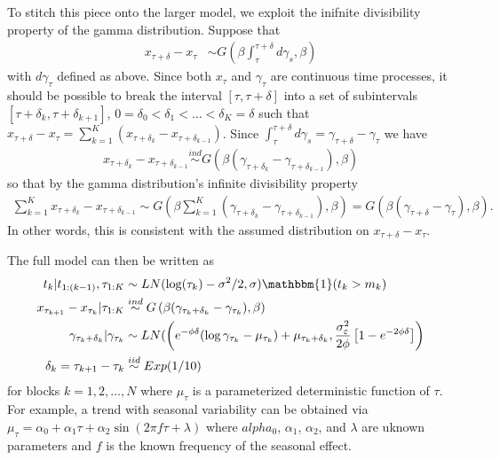 \documentclass{article}
\begin{document}
To stitch this piece onto the larger model, we exploit the inifnite divisibility property of the gamma distribution. Suppose that
\begin{align*}
x_{\tau + \delta} - x_\tau &\sim G(\beta \int_{\tau}^{\tau + \delta} d\gamma_s, \beta)
\end{align*}
with $d\gamma_\tau$ defined as above. Since both $x_{\tau}$ and $\gamma_{\tau}$ are continuous time processes, it should be possible to break the interval $[\tau, \tau + \delta]$ into a set of subintervals $[\tau + \delta_k, \tau + \delta_{k+1}]$, $0=\delta_0<\delta_1<\dots<\delta_K=\delta$ such that $x_{\tau + \delta} - x_{\tau} = \sum_{k=1}^K (x_{\tau + \delta_k} - x_{\tau + \delta_{k-1}})$. Since $\int_{\tau}^{\tau + \delta}d\gamma_s = \gamma_{\tau + \delta} - \gamma_{\tau}$ we have 
\begin{align*}
x_{\tau + \delta_k} - x_{\tau + \delta_{k-1}} \stackrel{ind}{\sim} G(\beta(\gamma_{\tau + \delta_k} - \gamma_{\tau + \delta_{k-1}}), \beta)
\end{align*}
so that by the gamma distribution's infinite divisibility property
\begin{align*}
\sum_{k=1}^Kx_{\tau + \delta_k} - x_{\tau + \delta_{k-1}} \sim G\left(\beta\sum_{k=1}^K(\gamma_{\tau + \delta_k} - \gamma_{\tau + \delta_{k-1}}), \beta\right) = G\left(\beta(\gamma_{\tau + \delta} - \gamma_\tau), \beta\right).
\end{align*}
In other words, this is consistent with the assumed distribution on $x_{\tau + \delta} - x_{\tau}$.

The full model can then be written as
\begin{align*}
t_k|t_{1:(k-1)}, \tau_{1:K} &\sim LN(\log(\tau_k) - \sigma^2/2, \sigma)\mathbbm{1}(t_k > m_k)\\
x_{\tau_{k+1}} - x_{\tau_{k}}|\tau_{1:K} & \stackrel{ind}{\sim} G\left(\beta(\gamma_{\tau_k + \delta_k} - \gamma_{\tau_k}),\beta\right)\\
\gamma_{\tau_k + \delta_k}|\gamma_{\tau_k} & \sim LN(\left(e^{-\phi\delta}(\log\gamma_{\tau_k} - \mu_{\tau_k}) + \mu_{\tau_k + \delta_k}, \frac{\sigma_{\varepsilon}^2}{2\phi}\left[1 - e^{-2\phi\delta}\right]\right)\\
\delta_{k} = \tau_{k+1} - \tau_{k} &\stackrel{iid}{\sim} Exp(1/10)
\end{align*}
for blocks $k=1,2,\dots,N$ where $\mu_{\tau}$ is a parameterized deterministic function of $\tau$. For example, a trend with seasonal variability can be obtained via $\mu_{\tau} = \alpha_0 + \alpha_1\tau + \alpha_2\sin(2\pi f \tau + \lambda)$ where $alpha_{0}$, $\alpha_1$, $\alpha_2$, and $\lambda$ are uknown parameters and $f$ is the known frequency of the seasonal effect.
\end{document}
